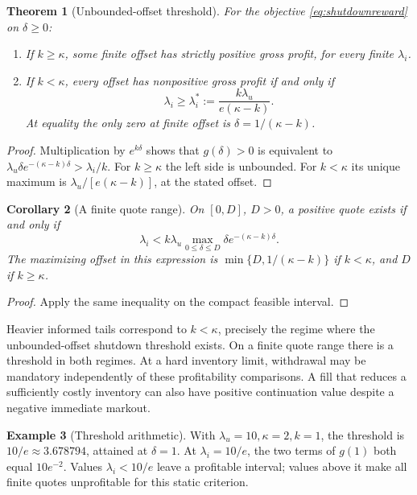 \documentclass[11pt]{article}
\theoremstyle{plain}
\newtheorem{theorem}{Theorem}[section]
\newtheorem{corollary}[theorem]{Corollary}
\theoremstyle{definition}
\newtheorem{example}[theorem]{Example}
\theoremstyle{remark}
\begin{document}
\begin{theorem}[Unbounded-offset threshold]\label{thm:shutdown}
For the objective \eqref{eq:shutdownreward} on \(\delta\ge0\):
\begin{enumerate}
\item If \(k\ge\kappa\), some finite offset has strictly positive
gross profit, for every finite \(\lambda_i\).
\item If \(k<\kappa\), every offset has nonpositive gross profit if and
only if
\[
\lambda_i\ge\lambda_i^\ast:=
\frac{k\lambda_u}{e(\kappa-k)}.
\]
At equality the only zero at finite offset is
\(\delta=1/(\kappa-k)\).
\end{enumerate}
\end{theorem}
\begin{proof}
Multiplication by \(e^{k\delta}\) shows that \(g(\delta)>0\) is equivalent
to
\(\lambda_u\delta e^{-(\kappa-k)\delta}>\lambda_i/k\).
For \(k\ge\kappa\) the left side is unbounded. For \(k<\kappa\) its
unique maximum is \(\lambda_u/[e(\kappa-k)]\), at the stated offset.
\end{proof}

\begin{corollary}[A finite quote range]\label{cor:finitequote}
On \([0,D]\), \(D>0\), a positive quote exists if and only if
\[
\lambda_i<
k\lambda_u\max_{0\le\delta\le D}
\delta e^{-(\kappa-k)\delta}.
\]
The maximizing offset in this expression is
\(\min\{D,1/(\kappa-k)\}\) if \(k<\kappa\), and \(D\) if
\(k\ge\kappa\).
\end{corollary}
\begin{proof}
Apply the same inequality on the compact feasible interval.
\end{proof}

Heavier informed tails correspond to \(k<\kappa\), precisely the regime
where the unbounded-offset shutdown threshold exists. On a finite quote
range there is a threshold in both regimes. At a hard inventory limit,
withdrawal may be mandatory independently of these profitability
comparisons. A fill that reduces a sufficiently costly inventory can also
have positive continuation value despite a negative immediate markout.

\begin{example}[Threshold arithmetic]
With \(\lambda_u=10,\kappa=2,k=1\), the threshold is
\(10/e\approx3.678794\), attained at \(\delta=1\).
At \(\lambda_i=10/e\), the two terms of \(g(1)\) both equal
\(10e^{-2}\). Values \(\lambda_i<10/e\) leave a profitable interval;
values above it make all finite quotes unprofitable for this static
criterion.
\end{example}
\end{document}
